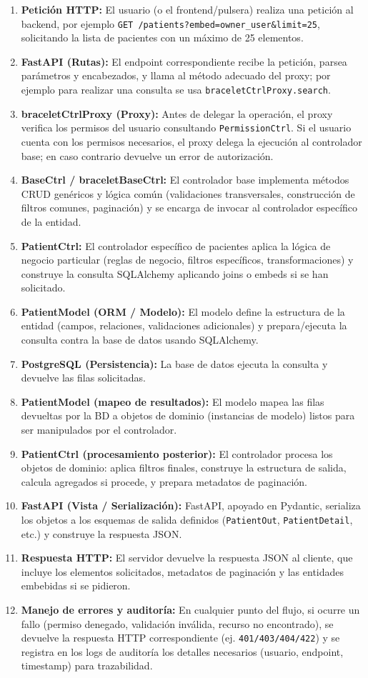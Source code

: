\documentclass[12pt, a4paper]{article}
\begin{document}
\begin{enumerate}
	\item \textbf{Petición HTTP:} El usuario (o el frontend/pulsera) realiza una petición al backend, por ejemplo \texttt{GET /patients?embed=owner\_user\&limit=25}, solicitando la lista de pacientes con un máximo de 25 elementos.
	\item \textbf{FastAPI (Rutas):} El endpoint correspondiente recibe la petición, parsea parámetros y encabezados, y llama al método adecuado del proxy; por ejemplo para realizar una consulta se usa  \verb|braceletCtrlProxy.search|.
	\item \textbf{braceletCtrlProxy (Proxy):} Antes de delegar la operación, el proxy verifica los permisos del usuario consultando \texttt{PermissionCtrl}. Si el usuario cuenta con los permisos necesarios, el proxy delega la ejecución al controlador base; en caso contrario devuelve un error de autorización.
	\item \textbf{BaseCtrl / braceletBaseCtrl:} El controlador base implementa métodos CRUD genéricos y lógica común (validaciones transversales, construcción de filtros comunes, paginación) y se encarga de invocar al controlador específico de la entidad.
	\item \textbf{PatientCtrl:} El controlador específico de pacientes aplica la lógica de negocio particular (reglas de negocio, filtros específicos, transformaciones) y construye la consulta SQLAlchemy aplicando joins o embeds si se han solicitado.
	\item \textbf{PatientModel (ORM / Modelo):} El modelo define la estructura de la entidad (campos, relaciones, validaciones adicionales) y prepara/ejecuta la consulta contra la base de datos usando SQLAlchemy.
	\item \textbf{PostgreSQL (Persistencia):} La base de datos ejecuta la consulta y devuelve las filas solicitadas.
	\item \textbf{PatientModel (mapeo de resultados):} El modelo mapea las filas devueltas por la BD a objetos de dominio (instancias de modelo) listos para ser manipulados por el controlador.
	\item \textbf{PatientCtrl (procesamiento posterior):} El controlador procesa los objetos de dominio: aplica filtros finales, construye la estructura de salida, calcula agregados si procede, y prepara metadatos de paginación.
	\item \textbf{FastAPI (Vista / Serialización):} FastAPI, apoyado en Pydantic, serializa los objetos a los esquemas de salida definidos (\texttt{PatientOut}, \texttt{PatientDetail}, etc.) y construye la respuesta JSON.
	\item \textbf{Respuesta HTTP:} El servidor devuelve la respuesta JSON al cliente, que incluye los elementos solicitados, metadatos de paginación y las entidades embebidas si se pidieron.
	\item \textbf{Manejo de errores y auditoría:} En cualquier punto del flujo, si ocurre un fallo (permiso denegado, validación inválida, recurso no encontrado), se devuelve la respuesta HTTP correspondiente (ej. \texttt{401/403/404/422}) y se registra en los logs de auditoría los detalles necesarios (usuario, endpoint, timestamp) para trazabilidad.
\end{enumerate}
\end{document}

